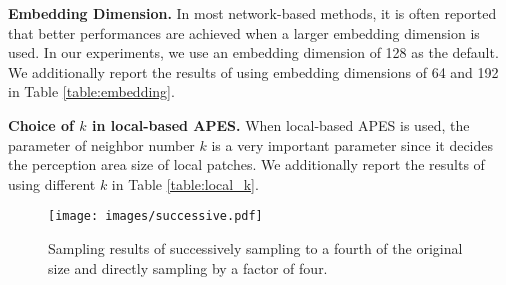 \documentclass[10pt,twocolumn,letterpaper]{article}
\begin{document}
\textbf{Embedding Dimension.}
In most network-based methods, it is often reported that better performances are achieved when a larger embedding dimension is used. In our experiments, we use an embedding dimension of 128 as the default. We additionally report the results of using embedding dimensions of 64 and 192 in Table \ref{table:embedding}.

\textbf{Choice of $k$ in local-based APES.}
When local-based APES is used, the parameter of neighbor number $k$ is a very important parameter since it decides the perception area size of local patches. We additionally report the results of using different $k$ in Table \ref{table:local_k}. 


\begin{table}[t]
\centering
{}
\caption{Ablation study of using a different number of neighbors for local-based edge point sampling.}
\label{table:local_k}
\end{table}

\begin{table}[t]
\centering
{}
\caption{Ablation study of considering the edge supervision. Results of using it for pre-training or joint training are both presented.}
\label{table:edgeSupervision}
\end{table}

\begin{figure}[t]
    \centering
    \texttt{[image: images/successive.pdf]} 
    \caption{Sampling results of successively sampling to a fourth of the original size and directly sampling by a factor of four. }
    \label{fig:successive}
\end{figure}
\end{document}
